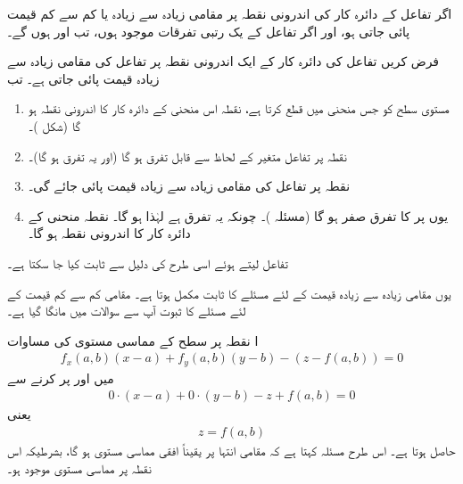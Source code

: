 اگر تفاعل  کے دائرہ کار کی اندرونی نقطہ  پر مقامی زیادہ سے زیادہ یا کم سے کم  قیمت پائی جاتی ہو، اور اگر تفاعل کے  یک رتبی تفرقات  موجود ہوں، تب  اور  ہوں گے۔ 

فرض کریں تفاعل  کی دائرہ  کار کے ایک  اندرونی نقطہ   پر تفاعل کی مقامی زیادہ سے زیادہ قیمت  پائی جاتی ہے۔ تب
\begin{enumerate}[1.]
\item
مستوی  سطح  کو جس منحنی  میں قطع کرتا ہے،  نقطہ  اس منحنی کے دائرہ کار کا اندرونی نقطہ ہو گا (شکل )۔
\item
نقطہ  پر تفاعل  متغیر  کے لحاظ سے قابل تفرق ہو گا (اور یہ تفرق  ہو گا)۔
\item
نقطہ  پر تفاعل  کی مقامی زیادہ سے زیادہ قیمت پائی جائے گی۔  
\item
یوں  پر  کا تفرق صفر ہو گا (مسئلہ )۔ چونکہ یہ تفرق  ہے لہٰذا  ہو گا۔
نقطہ   منحنی    کے دائرہ کار کا اندرونی نقطہ ہو گا۔
\end{enumerate}
تفاعل   لیتے ہوئے اسی طرح کی دلیل سے  ثابت کیا جا سکتا ہے۔

یوں مقامی زیادہ سے زیادہ قیمت کے لئے مسئلے  کا  ثابت مکمل ہوتا ہے۔ مقامی کم سے کم قیمت کے لئے مسئلے کا ثبوت آپ سے سوالات میں مانگا  گیا ہے۔

ا نقطہ  پر سطح   کے مماسی مستوی  کی مساوات
\begin{align*}
f_x(a,b)(x-a)+f_y(a,b)(y-b)-(z-f(a,b))=0
\end{align*}
میں  اور  پر کرنے سے
\begin{align*}
0\cdot(x-a)+0\cdot(y-b)-z+f(a,b)=0
\end{align*}
یعنی
\begin{align*}
z=f(a,b)
\end{align*}
حاصل ہوتا ہے۔ اس طرح مسئلہ  کہتا ہے  کہ مقامی انتہا پر  یقیناً افقی مماسی مستوی ہو گا، بشرطیکہ اس نقطہ پر مماسی مستوی موجود ہو۔

